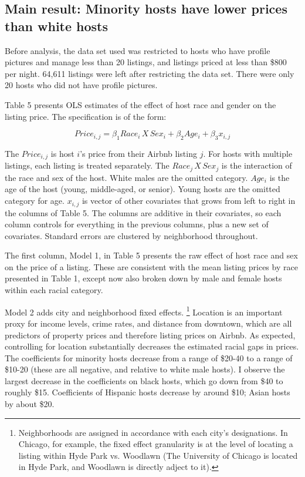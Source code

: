 \subsection{Main result: Minority hosts have lower prices than white hosts} 

Before analysis, the data set used was restricted to hosts who have profile pictures and manage less than 20 listings, and listings priced at less than \$800 per night. 64,611 listings were left after restricting the data set. There were only 20 hosts who did not have profile pictures.

Table 5 presents OLS estimates of the effect of host race and gender on the listing price. The specification is of the form: 

\[ Price_{i,j} = \beta_1 Race_{i}\,X \,Sex_i + \beta_2 Age_i + \beta_3 x_{i,j}\]

The $Price_{i,j}$ is host $i$'s price from their Airbnb listing $j$. For hosts with multiple listings, each listing is treated separately. The $Race_{j}\,X \,Sex_j$ is the interaction of the race and sex of the host. White males are the omitted category. $Age_i$ is the age of the host (young, middle-aged, or senior). Young hosts are the omitted category for age. $x_{i,j}$ is vector of other covariates that grows from left to right in the columns of Table 5. The columns are additive in their covariates, so each column controls for everything in the previous columns, plus a new set of covariates. Standard errors are clustered by neighborhood throughout.

The first column, Model 1, in Table 5 presents the raw effect of host race and sex on the price of a listing. These are consistent with the mean listing prices by race presented in Table 1, except now also broken down by male and female hosts within each racial category.

Model 2 adds city and neighborhood fixed effects.%
	\footnote{Neighborhoods are assigned in accordance with each city's designations. In Chicago, for example, the fixed effect granularity is at the level of locating a listing within Hyde Park vs. Woodlawn (The University of Chicago is located in Hyde Park, and Woodlawn is directly adject to it).}
Location is an important proxy for income levels, crime rates, and distance from downtown, which are all predictors of property prices and therefore listing prices on Airbnb. As expected, controlling for location substantially decreases the estimated racial gaps in prices. The coefficients for minority hosts decrease from a range of \$20-40 to a range of \$10-20 (these are all negative, and relative to white male hosts). I observe the largest decrease in the coefficients on black hosts, which go down from \$40 to roughly \$15. Coefficients of Hispanic hosts decrease by around \$10; Asian hosts by about \$20. 

